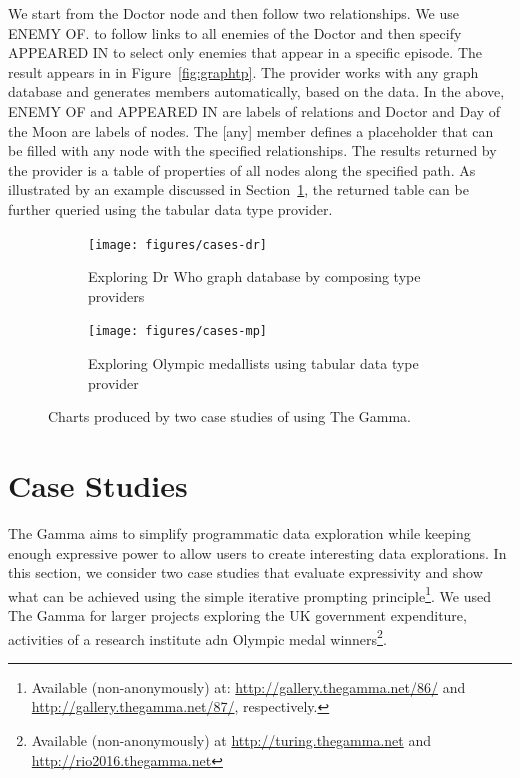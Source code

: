 \documentclass[manuscript,review,anonymous]{acmart}
\newcommand{\ikvd}[1]{{\fontfamily{zi4}\selectfont\small #1}}
\begin{document}
\noindent
We start from the \ikvd{Doctor} node and then follow two relationships. We use
\ikvd{\textquotesingle ENEMY OF\textquotesingle.\textquotesingle [any]\textquotesingle}
to follow links to all enemies of the Doctor and then specify
\ikvd{\textquotesingle APPEARED IN\textquotesingle}
to select only enemies that appear in a specific episode. The result appears in
in Figure~\ref{fig:graphtp}.
%
The provider works with any graph database and generates members automatically, based on the
data. In the above, \ikvd{ENEMY OF} and \ikvd{APPEARED IN} are labels
of relations and \ikvd{Doctor} and \ikvd{Day of the Moon} are labels of nodes. The
\ikvd{[any]} member defines a placeholder that can be filled with any node with the specified
relationships. The results returned by the provider is a table of properties of all nodes
along the specified path. As illustrated by an example discussed in Section~\ref{sec:cases},
the returned table can be further queried using the tabular data type provider.

\begin{figure}[t]
\vspace{-0.5em}
\centering
\begin{subfigure}[b]{0.49\textwidth}
  \centering
  \texttt{[image: figures/cases-dr]}
  \caption{Exploring Dr Who graph database by composing type providers}
  \label{fig:cases-dr}
\end{subfigure}
\hfill
\begin{subfigure}[b]{0.49\textwidth}
  \centering
  \texttt{[image: figures/cases-mp]}
  \caption{Exploring Olympic medallists using tabular data type provider}
  \label{fig:cases-mp}
\end{subfigure}
\vspace{-0.5em}
\caption{Charts produced by two case studies of using The Gamma.}
\label{fig:cases}
\vspace{-0.5em}
\end{figure}


\section{Case Studies}
\label{sec:cases}

The Gamma aims to simplify programmatic data exploration while keeping enough expressive power
to allow users to create interesting data explorations. In this section, we consider two case
studies that evaluate expressivity and show what can be achieved using the simple
iterative prompting principle\footnote{Available (non-anonymously) at:
\url{http://gallery.thegamma.net/86/} and  \url{http://gallery.thegamma.net/87/}, respectively.}.
We used The Gamma for larger projects exploring the UK government expenditure, activities of a
research institute adn Olympic medal winners\footnote{Available (non-anonymously)
at \url{http://turing.thegamma.net} and \url{http://rio2016.thegamma.net}}.
\end{document}
